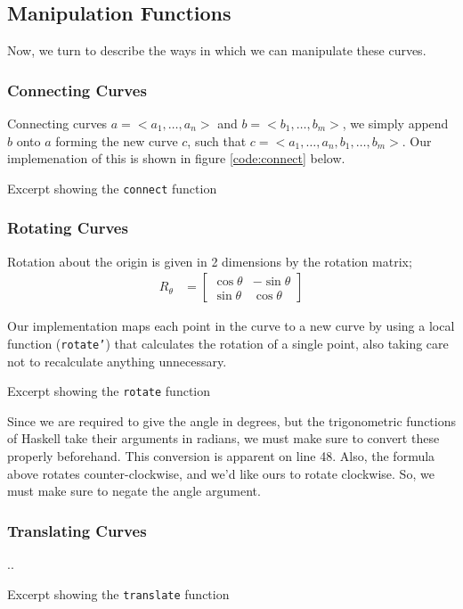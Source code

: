 


\newpage
\subsection{Manipulation Functions}
Now, we turn to describe the ways in which we can manipulate these curves.

\subsubsection{Connecting Curves}
Connecting curves $a = <a_1,\dots,a_n>$ and $b = <b_1,\dots,b_m>$, we simply
append $b$ onto $a$ forming the new curve $c$, such that $c =
<a_1,\dots,a_n,b_1,\dots,b_m>$. Our implemenation of this is shown in figure
\ref{code:connect} below.

{Excerpt showing the {\tt connect} function}

\subsubsection{Rotating Curves}
Rotation about the origin is given in 2 dimensions by the rotation matrix;
\begin{align}
    R_\theta &=
    \begin{bmatrix}
        \cos \theta & -\sin \theta \\
        \sin \theta & \cos \theta
    \end{bmatrix}
\end{align}

Our implementation maps each point in the curve to a new curve by using a
local function ({\tt rotate'}) that calculates the rotation of a single point,
also taking care not to recalculate anything unnecessary.

{Excerpt showing the {\tt rotate} function}

Since we are required to give the angle in degrees, but the trigonometric
functions of Haskell take their arguments in radians, we must make sure to
convert these properly beforehand. This conversion is apparent on line 48.
Also, the formula above rotates counter-clockwise, and we'd like ours to
rotate clockwise. So, we must make sure to negate the angle argument.

\subsubsection{Translating Curves}
..

{Excerpt showing the {\tt translate} function}

